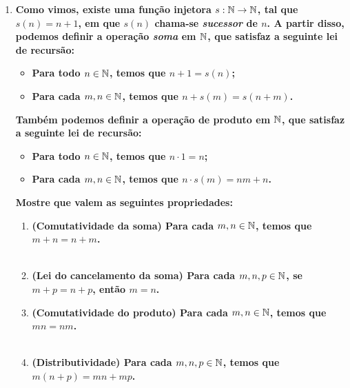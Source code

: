 \documentclass[%
  a4paper,%
  12pt,%
  fleqn,%
  english,%
  brazilian,%
]{article}
\begin{document}
\begin{enumerate}[wide, labelwidth=!, labelindent=0pt]
  \item \textbf{Como vimos, existe uma função injetora $s: \mathbb N \rightarrow \mathbb N$, tal que $s(n) = n+1$, em que 
    $s(n)$ chama-se \textit{sucessor} de $n$. A partir disso, podemos definir a operação \textit{soma} em 
    $\mathbb N$, que satisfaz a seguinte lei de recursão: }\\
  \begin{itemize}
    \item \textbf{Para todo $n \in \mathbb N$, temos que $n+1 = s(n)$;}
    \item \textbf{Para cada $m, n \in \mathbb N$, temos que $n + s(m) = s(n+m)$.}
  \end{itemize}
  \vspace{3mm}
  \textbf{Também podemos definir a operação de produto em $\mathbb N$, que satisfaz a seguinte lei de recursão:}\\
  \begin{itemize}
    \item \textbf{Para todo $n\in \mathbb N$, temos que $n\cdot 1 = n$;}
    \item \textbf{Para cada $m, n \in \mathbb N$, temos que $n\cdot s(m) = nm+n$.}
  \end{itemize}
    \vspace{3mm}
    \textbf{Mostre que valem as seguintes propriedades:}
  \begin{enumerate}[label=\alph*)]
      \item \textbf{(Comutatividade da soma) Para cada $m, n \in \mathbb N$, temos que $m+n = n+m$.}\\
        \\
      \item \textbf{(Lei do cancelamento da soma) Para cada $m, n, p \in \mathbb N$, se $m+p = n+ p$, então $m=n$.}
        \\

      \item \textbf{(Comutatividade do produto) Para cada $m, n \in \mathbb N$, temos que $mn = nm$.}\\
        \\
      \item \textbf{(Distributividade) Para cada $m,n,p \in \mathbb N$, temos que $m(n+p) = mn + mp$.}\\
        \\
      

\end{enumerate}
\end{enumerate}
\end{document}
